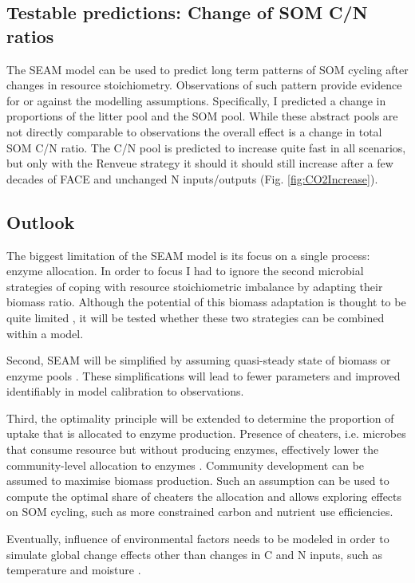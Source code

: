 \subsection{Testable predictions: Change of SOM C/N ratios}
The SEAM model can be used to predict long term patterns of SOM cycling
after changes in resource stoichiometry. Observations of such pattern 
provide evidence for or against the modelling assumptions.
Specifically, I predicted a change in proportions of the litter pool and the
SOM pool. While these abstract pools are not directly comparable to observations
the overall effect is a change in total SOM C/N ratio. The C/N pool is
predicted to increase quite fast in all scenarios, but only with
the Renveue strategy it should it should still increase after a few decades of
FACE and unchanged N inputs/outputs (Fig. \ref{fig:CO2Increase}).
 
\subsection{Outlook}
The biggest limitation of the SEAM model is its focus on a single process:
enzyme allocation. In order to focus I had to ignore the second microbial
strategies of coping with resource stoichiometric imbalance by adapting their
biomass ratio. Although the potential of this biomass
adaptation is thought to be quite limited \citep{Mooshammer14}, it will be
tested whether these two strategies can be combined within a model.

Second, SEAM will be simplified by assuming quasi-steady state of biomass or
enzyme pools \citep{Wutzler13}. These simplifications will lead to fewer
parameters and improved identifiably in model calibration to observations.

Third, the optimality principle will be extended to determine the
proportion of uptake that is allocated to enzyme production. Presence of cheaters,
i.e. microbes that consume resource but without producing enzymes, effectively
lower the community-level allocation to enzymes \citep{Kaiser14}. Community
development can be assumed to maximise biomass production. Such an assumption can be
used to compute the optimal share of cheaters the allocation and allows
exploring effects on SOM cycling, such as more constrained carbon and nutrient
use efficiencies.

Eventually, influence of environmental factors needs to be modeled in order to
simulate global change effects other than changes in C and N inputs, such as
temperature and moisture \citep{Davidson12}.
 

